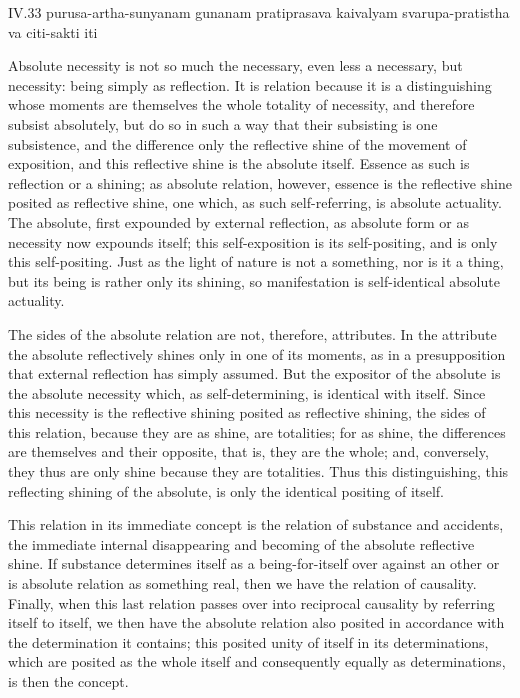 IV.33
purusa-artha-sunyanam gunanam pratiprasava kaivalyam
svarupa-pratistha va citi-sakti iti

Absolute necessity is not so much the necessary,
even less a necessary, but necessity:
being simply as reflection.
It is relation because it is a distinguishing
whose moments are themselves the whole totality of necessity,
and therefore subsist absolutely,
but do so in such a way that their subsisting is one subsistence,
and the difference only the reflective shine of
the movement of exposition,
and this reflective shine is the absolute itself.
Essence as such is reflection or a shining;
as absolute relation, however, essence is the
reflective shine posited as reflective shine,
one which, as such self-referring, is absolute actuality.
The absolute, first expounded by external reflection,
as absolute form or as necessity now expounds itself;
this self-exposition is its self-positing,
and is only this self-positing.
Just as the light of nature is not a something,
nor is it a thing, but its being is rather only its shining,
so manifestation is self-identical absolute actuality.

The sides of the absolute relation are not, therefore, attributes.
In the attribute the absolute reflectively shines only in one of its moments,
as in a presupposition that external reflection has simply assumed.
But the expositor of the absolute is the absolute necessity
which, as self-determining, is identical with itself.
Since this necessity is the reflective shining
posited as reflective shining, the sides of this relation,
because they are as shine, are totalities;
for as shine, the differences are themselves and their opposite,
that is, they are the whole;
and, conversely, they thus are only shine because they are totalities.
Thus this distinguishing, this reflecting shining of the absolute,
is only the identical positing of itself.

This relation in its immediate concept is
the relation of substance and accidents,
the immediate internal disappearing and becoming
of the absolute reflective shine.
If substance determines itself as a being-for-itself over
against an other or is absolute relation as something real,
then we have the relation of causality.
Finally, when this last relation passes over into
reciprocal causality by referring itself to itself,
we then have the absolute relation also posited
in accordance with the determination it contains;
this posited unity of itself in its determinations,
which are posited as the whole itself
and consequently equally as determinations,
is then the concept.
